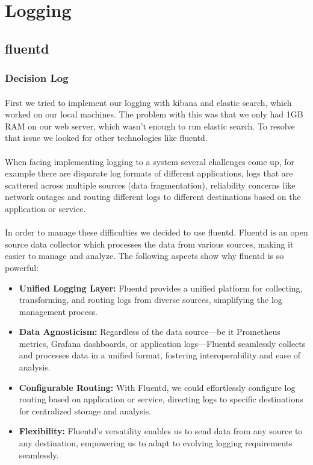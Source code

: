 \section{Logging}
\subsection{fluentd}
\subsubsection{Decision Log}
\paragraph{} First we tried to implement our logging with kibana and elastic search, which worked on our local machines. The problem with this was that we only had 1GB RAM on our web server,  which wasn't enough to run elastic search. To resolve that issue we looked for other technologies like fluentd.

\paragraph{} When facing implementing logging to a system several challenges come up, for example there are disparate log formats of different applications, logs that are scattered across multiple sources (data fragmentation), reliability concerns like network outages and routing different logs to different destinations based on the application or service.

\paragraph{} In order to manage these difficulties we decided to use fluentd. Fluentd is an open source data collector which processes the data from various sources, making it easier to manage and analyze. The following aspects show why fluentd is so powerful: 
\begin{itemize}
    \item \textbf{Unified Logging Layer:} Fluentd provides a unified platform for collecting, transforming, and routing logs from diverse sources, simplifying the log management process.
    \item \textbf{Data Agnosticism:} Regardless of the data source—be it Prometheus metrics, Grafana dashboards, or application logs—Fluentd seamlessly collects and processes data in a unified format, fostering interoperability and ease of analysis.
    \item \textbf{Configurable Routing:} With Fluentd, we could effortlessly configure log routing based on application or service, directing logs to specific destinations for centralized storage and analysis.
    \item \textbf{Flexibility:} Fluentd's versatility enables us to send data from any source to any destination, empowering us to adapt to evolving logging requirements seamlessly.
\end{itemize}

